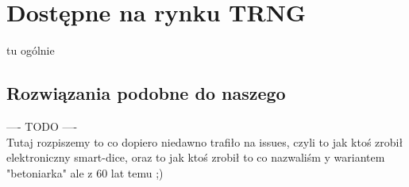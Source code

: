 \section{Dostępne na rynku TRNG}

tu ogólnie 

\subsection{Rozwiązania podobne do naszego}
    ---- TODO ---- \\

Tutaj rozpiszemy to co dopiero niedawno trafiło na issues, czyli to jak ktoś zrobił elektroniczny smart-dice,
oraz to jak ktoś zrobił to co nazwaliśm y wariantem "betoniarka" ale z 60 lat temu ;)